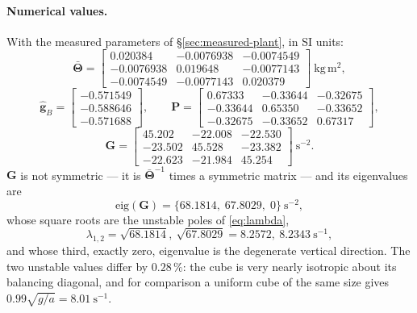 \paragraph{Numerical values.} With the measured parameters of
\S\ref{sec:measured-plant}, in SI units:
%
\begin{equation}
  \bar{\bm{\Theta}} = \begin{bmatrix}
     0.020384 & -0.0076938 & -0.0074549\\
    -0.0076938 & 0.019648 & -0.0077143\\
    -0.0074549 & -0.0077143 & 0.020379
  \end{bmatrix}\ \mathrm{kg\,m^2},
\end{equation}
%
\begin{equation}
  \hat{\bm{g}}_B = \begin{bmatrix}-0.571549\\ -0.588646\\ -0.571688\end{bmatrix},
  \qquad
  \bm{P} = \begin{bmatrix}
     0.67333 & -0.33644 & -0.32675\\
    -0.33644 & 0.65350 & -0.33652\\
    -0.32675 & -0.33652 & 0.67317
  \end{bmatrix},
\end{equation}
%
\begin{equation}
  \bm{G} = \begin{bmatrix}
     45.202 & -22.008 & -22.530\\
    -23.502 & 45.528 & -23.382\\
    -22.623 & -21.984 & 45.254
  \end{bmatrix}\ \mathrm{s^{-2}}.
\end{equation}
%
$\bm{G}$ is not symmetric --- it is $\bar{\bm{\Theta}}^{-1}$ times a symmetric
matrix --- and its eigenvalues are
%
\begin{equation}
  \mathrm{eig}(\bm{G}) = \{68.1814,\; 67.8029,\; 0\}\ \mathrm{s^{-2}},
\end{equation}
%
whose square roots are the unstable poles of \eqref{eq:lambda},
%
\begin{equation}
  \lambda_{1,2} = \sqrt{68.1814},\ \sqrt{67.8029}
                = 8.2572,\ 8.2343\ \mathrm{s^{-1}},
\end{equation}
%
and whose third, exactly zero, eigenvalue is the degenerate vertical
direction. The two unstable values differ by $0.28\,\%$: the cube is very
nearly isotropic about its balancing diagonal, and for comparison a uniform
cube of the same size gives $0.99\sqrt{g/a} = 8.01\ \mathrm{s^{-1}}$.

